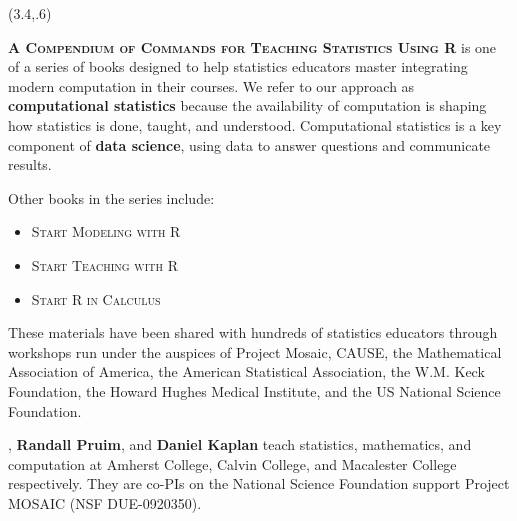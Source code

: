 \documentclass{article}
\begin{document}
{\selectfont







\begin{textblock}{5}(3.4,.6)


\raggedright
\textsc{\bfseries{A Compendium of Commands for Teaching Statistics Using R}} is one
of a series of books designed to help statistics educators master
integrating modern computation in their courses. We refer to our
approach as {\bf computational statistics} because
the availability of computation is shaping how statistics is done,
taught, and understood. Computational statistics is a key component of
{\bf data science}, using data to answer questions and communicate
results. 

\noindent Other books in the series include:
\begin{itemize}
\item \textsc{Start Modeling with R}
\item \textsc{Start Teaching with R}
\item \textsc{Start R in Calculus}
\end{itemize}


These materials have been shared with hundreds of statistics educators
through workshops run under the auspices of Project Mosaic, CAUSE, the
Mathematical Association of America, the American Statistical
Association, the W.M. Keck Foundation, the Howard Hughes Medical
Institute, and the US National
Science Foundation. 


\raggedright
\noindent {}, {\bf Randall Pruim}, and {\bf
Daniel Kaplan} teach statistics, mathematics, and computation at
Amherst College, Calvin College, and Macalester College
respectively.  They are co-PIs on the National Science Foundation
support Project MOSAIC (NSF DUE-0920350).

\medskip


\end{textblock}}
\end{document}
